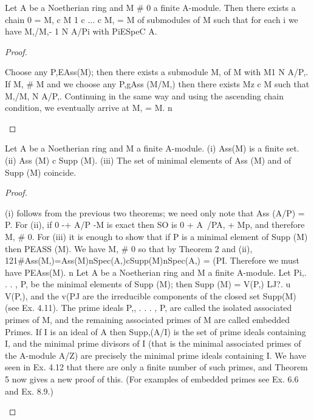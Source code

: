 \begin{theorem}[Theorem 6.4]\label{mcrt-auto-theorem-6-4}\uses{}
\begin{mathematicalrecord}
Let A be a Noetherian ring and M # 0 a finite A-module.
Then there exists a chain 0 = M, c M 1 c ... c M, = M of submodules of M
such that for each i we have M,/M,- 1 N A/Pi with PiESpeC A.
\end{mathematicalrecord}
\end{theorem}
\begin{proof}
\begin{mathematicalrecord}
Choose any P,EAss(M);      then there exists a submodule M, of M
with M1 N A/P,. If M, # M and we choose any P,gAss (M/M,) then there
exists Mz c M such that M,/M, N A/P,. Continuing in the same way and
using the ascending chain condition, we eventually arrive at M, = M. n
\end{mathematicalrecord}
\end{proof}


\begin{theorem}[Theorem 6.5]\label{mcrt-auto-theorem-6-5}\uses{}
\begin{mathematicalrecord}
Let A be a Noetherian ring and M a finite A-module.
   (i) Ass(M) is a finite set.
   (ii) Ass (M) c Supp (M).
   (iii) The set of minimal elements of Ass (M) and of Supp (M) coincide.
\end{mathematicalrecord}
\end{theorem}
\begin{proof}
\begin{mathematicalrecord}
(i) follows from the previous two theorems; we need only note
that Ass (A/P) = {P}. For (ii), if 0 -+ A/P -M     is exact then SO is 0 +
A~/PA, + Mp, and therefore M, # 0. For (iii) it is enough to show that
if P is a minimal element of Supp (M) then PEASS (M). We have M, # 0
so that by Theorem 2 and (ii),
          121#Ass(M,)=Ass(M)nSpec(A,)cSupp(M)nSpec(A,)
                         = (PI.
Therefore we must have PEAss(M).          n
    Let A be a Noetherian ring and M a finite A-module. Let Pi,. . . , P, be the
minimal elements of Supp (M); then Supp (M) = V(P,) LJ?. u V(P,), and the
 v(PJ are the irreducible components of the closed set Supp(M) (see
Ex. 4.11). The prime ideals P,, . . . , P, are called the isolated associated
primes of M, and the remaining associated primes of M are called embedded
Primes. If I is an ideal of A then Supp,(A/I)       is the set of prime ideals
containing I, and the minimal prime divisors of I (that is the minimal
associated primes of the A-module A/Z) are precisely the minimal prime
ideals containing I. We have seen in Ex. 4.12 that there are only a finite
number of such primes, and Theorem 5 now gives a new proof of this.
(For examples of embedded primes see Ex. 6.6 and Ex. 8.9.)
\end{mathematicalrecord}
\end{proof}


